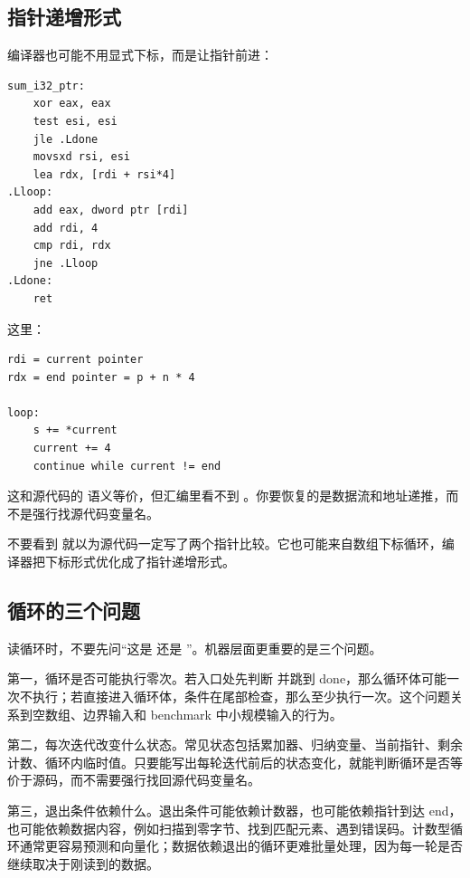 \subsection{指针递增形式}

编译器也可能不用显式下标，而是让指针前进：

\begin{lstlisting}
sum_i32_ptr:
    xor eax, eax
    test esi, esi
    jle .Ldone
    movsxd rsi, esi
    lea rdx, [rdi + rsi*4]
.Lloop:
    add eax, dword ptr [rdi]
    add rdi, 4
    cmp rdi, rdx
    jne .Lloop
.Ldone:
    ret
\end{lstlisting}

这里：

\begin{lstlisting}
rdi = current pointer
rdx = end pointer = p + n * 4

loop:
    s += *current
    current += 4
    continue while current != end
\end{lstlisting}

这和源代码的  语义等价，但汇编里看不到 。你要恢复的是数据流和地址递推，而不是强行找源代码变量名。

\begin{warningbox}
不要看到  就以为源代码一定写了两个指针比较。它也可能来自数组下标循环，编译器把下标形式优化成了指针递增形式。
\end{warningbox}

\subsection{循环的三个问题}

读循环时，不要先问“这是  还是 ”。机器层面更重要的是三个问题。

第一，循环是否可能执行零次。若入口处先判断  并跳到 done，那么循环体可能一次不执行；若直接进入循环体，条件在尾部检查，那么至少执行一次。这个问题关系到空数组、边界输入和 benchmark 中小规模输入的行为。

第二，每次迭代改变什么状态。常见状态包括累加器、归纳变量、当前指针、剩余计数、循环内临时值。只要能写出每轮迭代前后的状态变化，就能判断循环是否等价于源码，而不需要强行找回源代码变量名。

第三，退出条件依赖什么。退出条件可能依赖计数器，也可能依赖指针到达 end，也可能依赖数据内容，例如扫描到零字节、找到匹配元素、遇到错误码。计数型循环通常更容易预测和向量化；数据依赖退出的循环更难批量处理，因为每一轮是否继续取决于刚读到的数据。

